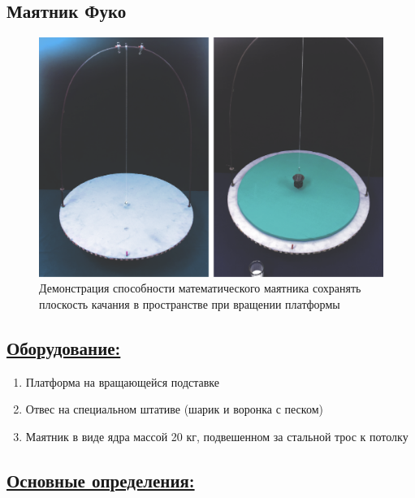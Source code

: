 \documentclass[14pt,a4paper,oneside]{extarticle}	%
\begin{document}
	
	\begin{center}
		\subsection*{Маятник Фуко}
	\end{center}
		

\begin{figure}[H] 	
	\centering 	
	\includegraphics[width=0.9\linewidth]{fuko-1.png}
	\caption{Демонстрация способности математического маятника сохранять плоскость качания в пространстве при вращении платформы}
	\label{fuko-1}
\end{figure}
	
	\subsection*{\underline{Оборудование:}}

		\begin{enumerate}
			\item Платформа на вращающейся подставке
			\item Отвес на специальном штативе (шарик и воронка с песком)
			\item Маятник в виде ядра массой 20 кг, подвешенном за стальной трос к потолку
		\end{enumerate}

	\newpage
		\subsection*{\underline{Основные определения:}}
		
\end{document}
